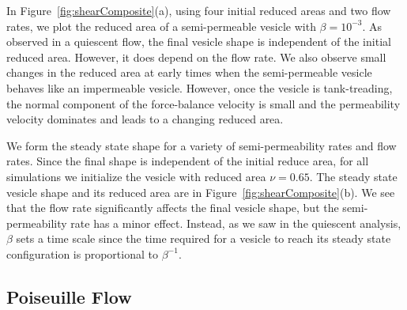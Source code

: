 \documentclass[9pt,twocolumn,twoside,lineno]{pnas-new}
\newif\ifTikz
\begin{document}
In Figure~\ref{fig:shearComposite}(a), using four initial reduced areas
and two flow rates, we plot the reduced area of a semi-permeable vesicle
with $\beta = 10^{-3}$. As observed in a quiescent flow, the final
vesicle shape is independent of the initial reduced area. However, it
does depend on the flow rate. We also observe small changes in the
reduced area at early times when the semi-permeable vesicle behaves like
an impermeable vesicle. However, once the vesicle is tank-treading, the
normal component of the force-balance velocity is small and the
permeability velocity dominates and leads to a changing reduced area.

We form the steady state shape for a variety of semi-permeability rates
and flow rates. Since the final shape is independent of the initial
reduce area, for all simulations we initialize the vesicle with reduced
area $\nu = 0.65$. The steady state vesicle shape and its reduced
area are in Figure~\ref{fig:shearComposite}(b). We see that the flow
rate significantly affects the final vesicle shape, but the
semi-permeability rate has a minor effect. Instead, as we saw in the
quiescent analysis, $\beta$ sets a time scale since the time required
for a vesicle to reach its steady state configuration is proportional to
$\beta^{-1}$.

\subsection*{Poiseuille Flow}
\begin{figure*}[htp]
  \ifTikz
  \centering
  
  \fi
  \caption{\label{fig:parabolicComposite} (a) The steady state shape of
  a semi-permeable vesicle submerged in a Poiseuille flow with varying
  initial reduced areas and flow rates. (b) The steady state inclination
  angle for four different flow velocities. The steady state shapes are
  superimposed. (c) The reduced area of the slipper formed with the flow
  rate of 800 $\mu m/s$. (d) The vesicle shape shown with the background
  imposed flow. The channel width is 12.5 times larger than the vesicle
  radius. The corresponding reduced area of each vesicle is indicated by
  the marks in plot (c).}
\end{figure*}
\end{document}
